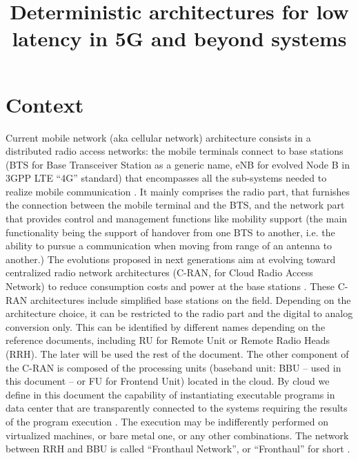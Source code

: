 \documentclass{article}
\begin{document}
\title{Deterministic architectures for low latency in 5G and beyond systems}


\maketitle

\section*{Context}

 Current mobile network (aka cellular network) architecture consists in a distributed radio access networks: the mobile terminals connect to base stations (BTS for Base Transceiver Station as a generic name, eNB for evolved Node B in 3GPP LTE “4G” standard) that encompasses all the sub-systems needed to realize mobile communication \cite{bouguen2012lte}. 
 It mainly comprises the radio part, that furnishes the connection between the mobile terminal and the BTS, and the network part that provides control and management functions like mobility support (the main functionality being the support of handover from one BTS to another, i.e. the ability to pursue a communication when moving from range of an antenna to another.) The evolutions proposed in next generations aim at evolving toward centralized radio network architectures (C-RAN, for Cloud Radio Access Network) to reduce consumption costs and power at the base stations \cite{mobile2011c}. These C-RAN architectures include simplified base stations on the field. Depending on the architecture choice, it can be restricted to the radio part and the digital to analog conversion only. This can be identified by different names depending on the reference documents, including RU for Remote Unit or Remote Radio Heads (RRH). The later will be used the rest of the document. The other component of the C-RAN is composed of the processing units (baseband unit: BBU – used in this document – or FU for Frontend Unit) located in the cloud. By cloud we define in this document the capability of instantiating executable programs in data center that are transparently connected to the systems  requiring the results of the program execution \cite{mobile2011c}. The execution may be indifferently performed on virtualized machines, or bare metal one, or any other combinations. The network between RRH and BBU is called “Fronthaul Network”, or ``Fronthaul'' for short \cite{ieeep802}.\\
\end{document}
